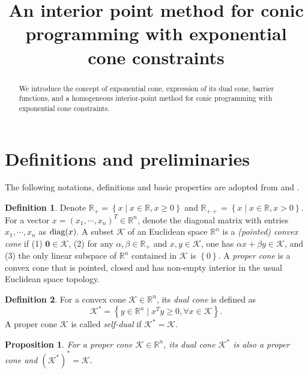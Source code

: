 \documentclass[10pt]{article}
\title{An interior point method for conic programming with exponential cone constraints}
\theoremstyle{definition}
\newtheorem{defin}{Definition}
\theoremstyle{plain}
\newtheorem{prop}{Proposition}
\def\diagonal{\protect{\textnormal{diag}}}
\begin{document}
\maketitle

\begin{abstract}
We introduce the concept of exponential cone, expression of its dual cone, barrier functions, and a homogeneous interior-point method for conic programming with exponential cone constraints.
\end{abstract}

\section{Definitions and preliminaries}
The following notations, definitions and basic properties are adopted from \cite{Robert_thesis} and \cite{Akle_thesis}.

\begin{defin} Denote $\mathbb{R}_+ = \left\{x \mid x\in \mathbb{R}, x\geq 0\right\}$ and $\mathbb{R}_{++} = \left\{x \mid x\in \mathbb{R}, x> 0\right\}$. For a vector $x = (x_1, \cdots, x_n)^T \in \mathbb{R}^n$, denote the diagonal matrix with entries $x_1, \cdots, x_n$ as $\diagonal(x)$. A subset $\mathcal{K}$ of an Euclidean space $\mathbb{R}^n$ is a \textit{(pointed) convex cone} if (1) $\mathbf{0} \in \mathcal{K}$, (2) for any $\alpha, \beta \in \mathbb{R}_+$ and $x,y \in \mathcal{K}$, one has $\alpha x + \beta y \in \mathcal{K}$, and (3) the only linear subspace of $\mathbb{R}^n$ contained in $\mathcal{K}$ is $\left\{0\right\}$. A \textit{proper cone} is a convex cone that is pointed, closed and has non-empty interior in the usual Euclidean space topology.
\end{defin}

\begin{defin}
	For a convex cone $\mathcal{K} \in \mathbb{R}^n$, its \textit{dual cone} is defined as 
	\[\mathcal{K}^* = \left\{y\in \mathbb{R}^n \mid x^T y\geq 0, \forall x \in \mathcal{K} \right\}.\]
	A proper cone $\mathcal{K}$ is called \textit{self-dual} if $\mathcal{K}^* = \mathcal{K}$.
\end{defin}
\begin{prop}
	For a proper cone $\mathcal{K} \in \mathbb{R}^n$, its dual cone $\mathcal{K}^*$ is also a proper cone and  $(\mathcal{K}^*)^* = \mathcal{K}$. 
\end{prop}
\end{document}
